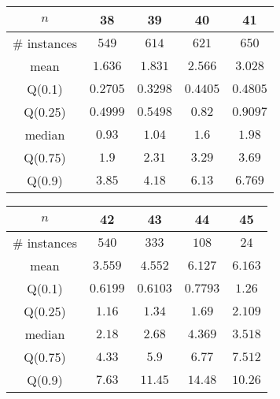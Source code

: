 \begin{tabular}{c|cccc} 
\hline 
$n$ & 38 & 39 & 40 & 41 \tabularnewline 
\hline 
\hline 
\# instances & $549$ & $614$ & $621$ & $650$ \tabularnewline 
mean & $1.636$ & $1.831$ & $2.566$ & $3.028$ \tabularnewline 
Q(0.1) & $0.2705$ & $0.3298$ & $0.4405$ & $0.4805$ \tabularnewline 
Q(0.25) & $0.4999$ & $0.5498$ & $0.82$ & $0.9097$ \tabularnewline 
median & $0.93$ & $1.04$ & $1.6$ & $1.98$ \tabularnewline 
Q(0.75) & $1.9$ & $2.31$ & $3.29$ & $3.69$ \tabularnewline 
Q(0.9) & $3.85$ & $4.18$ & $6.13$ & $6.769$ \tabularnewline 
\hline 
\end{tabular} 
\medskip{} 

\begin{tabular}{c|cccc} 
\hline 
$n$ & 42 & 43 & 44 & 45 \tabularnewline 
\hline 
\hline 
\# instances & $540$ & $333$ & $108$ & $24$ \tabularnewline 
mean & $3.559$ & $4.552$ & $6.127$ & $6.163$ \tabularnewline 
Q(0.1) & $0.6199$ & $0.6103$ & $0.7793$ & $1.26$ \tabularnewline 
Q(0.25) & $1.16$ & $1.34$ & $1.69$ & $2.109$ \tabularnewline 
median & $2.18$ & $2.68$ & $4.369$ & $3.518$ \tabularnewline 
Q(0.75) & $4.33$ & $5.9$ & $6.77$ & $7.512$ \tabularnewline 
Q(0.9) & $7.63$ & $11.45$ & $14.48$ & $10.26$ \tabularnewline 
\hline 
\end{tabular} 
\medskip{} 

